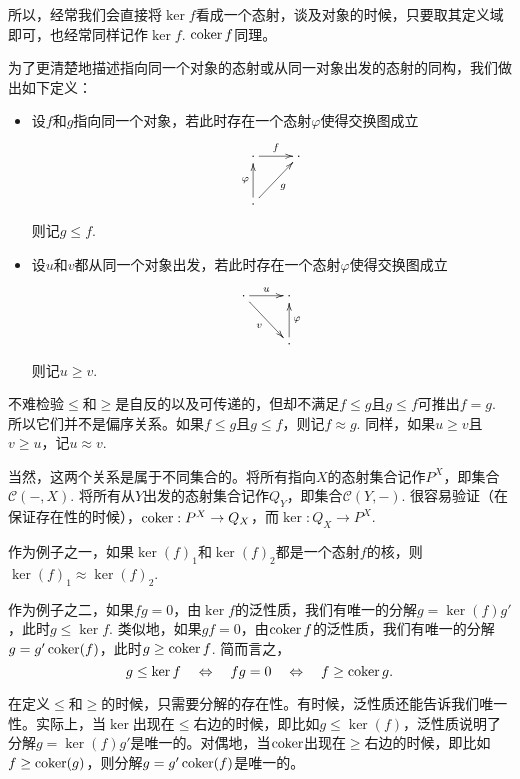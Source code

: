 所以，经常我们会直接将$\ker f$看成一个态射，谈及对象的时候，只要取其定义域即可，也经常同样记作$\ker f$. $\operatorname{coker} f$同理。

\begin{para}

为了更清楚地描述指向同一个对象的态射或从同一对象出发的态射的同构，我们做出如下定义：

\begin{itemize}
\item 设$f$和$g$指向同一个对象，若此时存在一个态射$\varphi$使得交换图成立
\[
\begin{xy}
	\xymatrix{
	\cdot\ar[r]^-{f} &\cdot\\
	\cdot \ar[u]^{\varphi}\ar[ru]_{g}
	}
\end{xy}
\]
则记$g\leq f$. 

\item  设$u$和$v$都从同一个对象出发，若此时存在一个态射$\varphi$使得交换图成立
\[
\begin{xy}
	\xymatrix{
	\cdot \ar[r]^-{u}\ar[rd]_{v} &\cdot \\
	&\cdot \ar[u]_{\varphi}
	}
\end{xy}
\]
则记$u\geq v$. 
\end{itemize}

不难检验$\leq$和$\geq$是自反的以及可传递的，但却不满足$f\leq g$且$g\leq f$可推出$f=g$. 所以它们并不是偏序关系。如果$f\leq g$且$g\leq f$，则记$f\approx g$. 同样，如果$u\geq v$且$v\geq u$，记$u\approx v$.

当然，这两个关系是属于不同集合的。将所有指向$X$的态射集合记作$P^X$，即集合$\mathcal{C}(-,X)$. 将所有从$Y$出发的态射集合记作$Q_Y$，即集合$\mathcal{C}(Y,-)$. 很容易验证（在保证存在性的时候），$\operatorname{coker} : P^X \to Q_X$，而$\ker : Q_X\to P^X$.
\end{para}

作为例子之一，如果$\ker(f)_1$和$\ker(f)_2$都是一个态射$f$的核，则$\ker(f)_1\approx\ker(f)_2$. 

作为例子之二，如果$fg=0$，由$\ker f$的泛性质，我们有唯一的分解$g=\ker(f)g'$，此时$g\leq \ker f$. 类似地，如果$gf=0$，由$\operatorname{coker} f$的泛性质，我们有唯一的分解$g=g'\operatorname{coker}(f)$，此时$g\geq \operatorname{coker} f$. 简而言之，
\[
	g\leq \ker f \quad \Leftrightarrow \quad fg=0\quad  \Leftrightarrow \quad f\geq \operatorname{coker} g.
\]

\begin{para}
在定义$\leq$和$\geq$的时候，只需要分解的存在性。有时候，泛性质还能告诉我们唯一性。实际上，当$\ker$出现在$\leq$右边的时候，即比如$g\leq \ker(f)$，泛性质说明了分解$g=\ker(f)g'$是唯一的。对偶地，当$\operatorname{coker}$出现在$\geq$右边的时候，即比如$f\geq \operatorname{coker}(g)$，则分解$g=g'\operatorname{coker}(f)$是唯一的。
\end{para}

